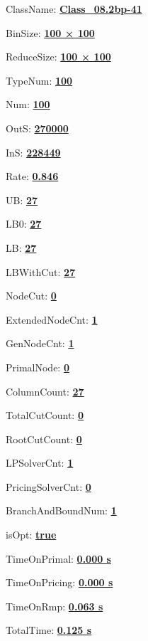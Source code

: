 \documentclass[11pt]{article}
\begin{document}
\pagestyle{empty}


ClassName: \underline{\textbf{Class_08.2bp-41}}
\par
BinSize: \underline{\textbf{100 × 100}}
\par
ReduceSize: \underline{\textbf{100 × 100}}
\par
TypeNum: \underline{\textbf{100}}
\par
Num: \underline{\textbf{100}}
\par
OutS: \underline{\textbf{270000}}
\par
InS: \underline{\textbf{228449}}
\par
Rate: \underline{\textbf{0.846}}
\par
UB: \underline{\textbf{27}}
\par
LB0: \underline{\textbf{27}}
\par
LB: \underline{\textbf{27}}
\par
LBWithCut: \underline{\textbf{27}}
\par
NodeCut: \underline{\textbf{0}}
\par
ExtendedNodeCnt: \underline{\textbf{1}}
\par
GenNodeCnt: \underline{\textbf{1}}
\par
PrimalNode: \underline{\textbf{0}}
\par
ColumnCount: \underline{\textbf{27}}
\par
TotalCutCount: \underline{\textbf{0}}
\par
RootCutCount: \underline{\textbf{0}}
\par
LPSolverCnt: \underline{\textbf{1}}
\par
PricingSolverCnt: \underline{\textbf{0}}
\par
BranchAndBoundNum: \underline{\textbf{1}}
\par
isOpt: \underline{\textbf{true}}
\par
TimeOnPrimal: \underline{\textbf{0.000 s}}
\par
TimeOnPricing: \underline{\textbf{0.000 s}}
\par
TimeOnRmp: \underline{\textbf{0.063 s}}
\par
TotalTime: \underline{\textbf{0.125 s}}
\par
\newpage


\end{document}
